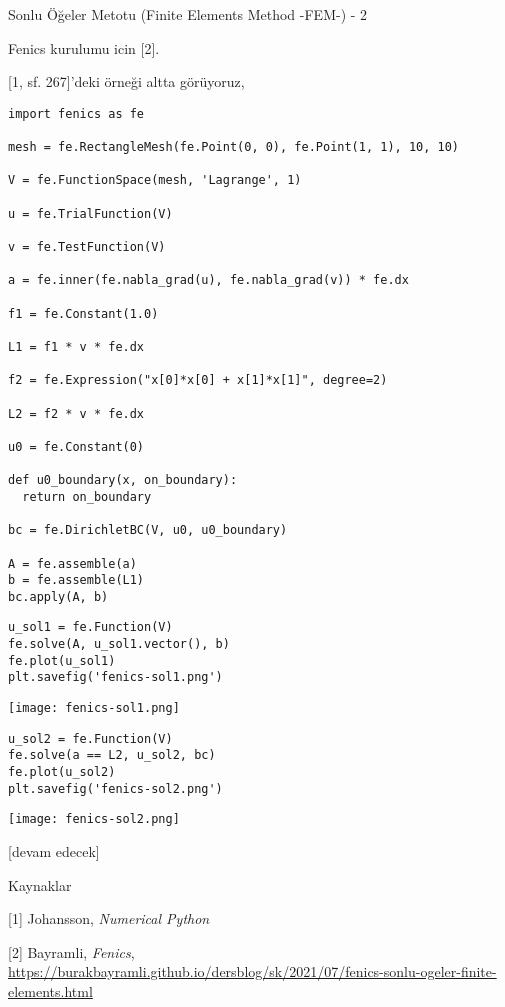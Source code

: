 \documentclass[12pt,fleqn]{article}\usepackage{../../common}
\begin{document}
Sonlu Öğeler Metotu (Finite Elements Method -FEM-) - 2

Fenics kurulumu icin [2].

[1, sf. 267]'deki örneği altta görüyoruz,

\begin{verbatim}
import fenics as fe

mesh = fe.RectangleMesh(fe.Point(0, 0), fe.Point(1, 1), 10, 10)

V = fe.FunctionSpace(mesh, 'Lagrange', 1)

u = fe.TrialFunction(V)

v = fe.TestFunction(V)

a = fe.inner(fe.nabla_grad(u), fe.nabla_grad(v)) * fe.dx

f1 = fe.Constant(1.0)

L1 = f1 * v * fe.dx

f2 = fe.Expression("x[0]*x[0] + x[1]*x[1]", degree=2)

L2 = f2 * v * fe.dx

u0 = fe.Constant(0)

def u0_boundary(x, on_boundary):
  return on_boundary

bc = fe.DirichletBC(V, u0, u0_boundary)

A = fe.assemble(a)
b = fe.assemble(L1)
bc.apply(A, b)
\end{verbatim}

\begin{verbatim}
u_sol1 = fe.Function(V)
fe.solve(A, u_sol1.vector(), b)
fe.plot(u_sol1)
plt.savefig('fenics-sol1.png')
\end{verbatim}

\texttt{[image: fenics-sol1.png]}

\begin{verbatim}
u_sol2 = fe.Function(V)
fe.solve(a == L2, u_sol2, bc)
fe.plot(u_sol2)
plt.savefig('fenics-sol2.png')
\end{verbatim}

\texttt{[image: fenics-sol2.png]}



[devam edecek]

Kaynaklar

[1] Johansson, {\em Numerical Python}

[2] Bayramli, {\em Fenics},
    \url{https://burakbayramli.github.io/dersblog/sk/2021/07/fenics-sonlu-ogeler-finite-elements.html}
\end{document}
